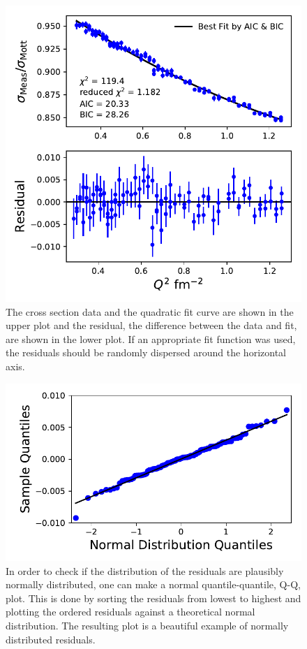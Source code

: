 \documentclass[10pt,superscriptaddress,aps,prc,twocolumn]{revtex4-1}
\begin{document}
\begin{figure}[htb]
\includegraphics[width=\columnwidth]{Figure/NewVsOld.pdf}
\caption{The cross section data and the quadratic fit curve are shown in the upper plot and the residual, the difference between
the data and fit, are shown in the lower plot.    If an appropriate fit function was used, the residuals should be randomly
dispersed around the horizontal axis.}
\label{residual}
\end{figure}

\begin{figure}[htb]
\includegraphics[width=\columnwidth]{Figure/NormQQ.pdf}
\caption{In order to check if the distribution of the residuals are plausibly normally distributed, one can make a normal
 quantile-quantile, Q-Q, plot.
This is done by sorting the residuals from lowest to highest and plotting the ordered residuals against a theoretical 
normal distribution.   The resulting plot is a beautiful example of normally distributed residuals.}
\label{normqq}
\end{figure}
\end{document}

